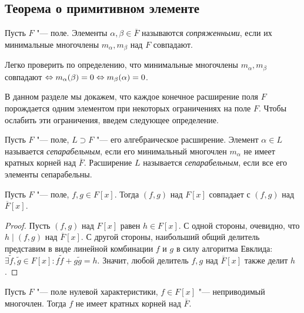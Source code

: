 \subsection{Теорема о примитивном элементе}

\begin{definition}
	Пусть $F$ "--- поле. Элементы $\alpha, \beta \in \overline{F}$ называются \textit{сопряженными}, если их минимальные многочлены $m_\alpha, m_\beta$ над $F$ совпадают.
\end{definition}

\begin{note}
	Легко проверить по определению, что минимальные многочлены $m_\alpha, m_\beta$ совпадают $\Leftrightarrow m_\alpha(\beta) = 0 \Leftrightarrow m_\beta(\alpha) = 0$.
\end{note}

В данном разделе мы докажем, что каждое конечное расширение поля $F$ порождается одним элементом при некоторых ограничениях на поле $F$. Чтобы ослабить эти ограничения, введем следующее определение.

\begin{definition}
	Пусть $F$ "--- поле, $L \supset F$ "--- его алгебраическое расширение. Элемент $\alpha \in L$ называется \textit{сепарабельным}, если его минимальный многочлен $m_\alpha$ не имеет кратных корней над $\overline{F}$. Расширение $L$ называется \textit{сепарабельным}, если все его элементы сепарабельны.
\end{definition}

\begin{proposition}
	Пусть $F$ "--- поле, $f, g \in F[x]$. Тогда $(f, g)$ над $F[x]$ совпадает с $(f, g)$ над $\overline{F}[x]$.
\end{proposition}

\begin{proof}
	Пусть $(f, g)$ над $F[x]$ равен $h \in F[x]$. С одной стороны, очевидно, что $h \mid (f, g)$ над $\overline{F}[x]$. С другой стороны, наибольший общий делитель представим в виде линейной комбинации $f$ и $g$ в силу алгоритма Евклида: $\exists \widetilde{f}, \widetilde{g} \in F[x]: f\widetilde{f} + g\widetilde{g} = h$. Значит, любой делитель $f, g$ над $\overline{F}[x]$ также делит $h$.
\end{proof}

\begin{proposition}
	Пусть $F$ "--- поле нулевой характеристики, $f \in F[x]$ "--- неприводимый многочлен. Тогда $f$ не имеет кратных корней над $\overline{F}$.
\end{proposition}

